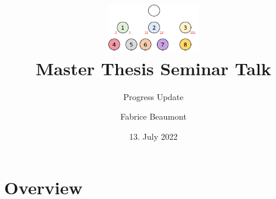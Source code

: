 

\title[MA Seminar Talk - Progress]{
	\centering
	\includegraphics[width=0.3\textwidth]{images/WLLT}\\
	Master Thesis Seminar Talk	
}
\subtitle{Progress Update}
\author[F. Beaumont]{Fabrice Beaumont}
\date{13. July 2022}

\newcommand{\figureWidth}{7cm}
\newcommand{\figureHorizontal}{2cm}
\newcommand{\figureVertical}{5cm}



\begin{frame}
	\titlepage
\end{frame}

\section{Overview}

